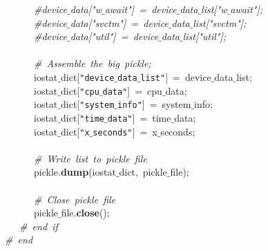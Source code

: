 \mbox{}\ \ \ \ \ \ \textit{\#device$\_$data["{}w$\_$await"{}]\ =\ device$\_$data$\_$list["{}w$\_$await"{}];} \\
\mbox{}\ \ \ \ \ \ \textit{\#device$\_$data["{}svctm"{}]\ =\ device$\_$data$\_$list["{}svctm"{}];} \\
\mbox{}\ \ \ \ \ \ \textit{\#device$\_$data["{}util"{}]\ =\ device$\_$data$\_$list["{}util"{}];} \\
\mbox{}\ \ \ \ \ \  \\
\mbox{}\ \ \ \ \ \ \textit{\#\ Assemble\ the\ big\ pickle;} \\
\mbox{}\ \ \ \ \ \ iostat$\_$dict[\texttt{"{}device$\_$data$\_$list"{}}]\ =\ device$\_$data$\_$list; \\
\mbox{}\ \ \ \ \ \ iostat$\_$dict[\texttt{"{}cpu$\_$data"{}}]\ =\ cpu$\_$data; \\
\mbox{}\ \ \ \ \ \ iostat$\_$dict[\texttt{"{}system$\_$info"{}}]\ =\ system$\_$info; \\
\mbox{}\ \ \ \ \ \ iostat$\_$dict[\texttt{"{}time$\_$data"{}}]\ =\ time$\_$data; \\
\mbox{}\ \ \ \ \ \ iostat$\_$dict[\texttt{"{}x$\_$seconds"{}}]\ =\ x$\_$seconds; \\
\mbox{}\ \ \ \ \ \  \\
\mbox{}\ \ \ \ \ \ \textit{\#\ Write\ list\ to\ pickle\ file} \\
\mbox{}\ \ \ \ \ \ pickle.\textbf{dump}(iostat$\_$dict,\ pickle$\_$file); \\
\mbox{}\ \ \ \ \ \  \\
\mbox{}\ \ \ \ \ \ \textit{\#\ Close\ pickle\ file} \\
\mbox{}\ \ \ \ \ \ pickle$\_$file.\textbf{close}(); \\
\mbox{}\ \ \ \textit{\#\ end\ if} \\
\mbox{}\textit{\#\ end} \\
\mbox{}
